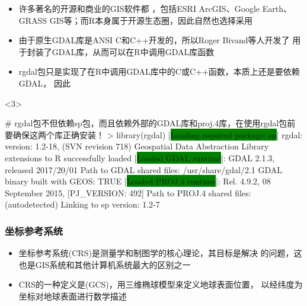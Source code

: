 \begin{frame}[t,fragile]{\subsecname}{\subsubsecname}
\begin{itemize}
\item<1-> 许多著名的开源和商业的GIS软件都
，包括ESRI ArcGIS、Google Earth、GRASS GIS等；而R本身属于开源生态圈，因此自然也选择采用
\item<2-> 由于原生GDAL库是ANSI C和C++开发的，所以Roger Bivand等人开发了
用于封装了GDAL库，从而可以在R中调用GDAL库函数
\item<3-> rgdal包只是实现了在R中调用GDAL库中的C或C++函数，本质上还是要依赖GDAL，
因此
\end{itemize}

\begin{onlyenv}<3>
\begin{rcode}
# rgdal包不但依赖sp包，而且依赖外部的GDAL库和proj.4库，在使用rgdal包前要确保这两个库正确安装！
> library(rgdal)
|\colorbox{green}{Loading required package: sp}|
rgdal: version: 1.2-18, (SVN revision 718)
 Geospatial Data Abstraction Library extensions to R successfully loaded
 |\colorbox{green}{Loaded GDAL runtime}|: GDAL 2.1.3, released 2017/20/01
 Path to GDAL shared files: /usr/share/gdal/2.1
 GDAL binary built with GEOS: TRUE 
 |\colorbox{green}{Loaded PROJ.4 runtime}|: Rel. 4.9.2, 08 September 2015, [PJ_VERSION: 492]
 Path to PROJ.4 shared files: (autodetected)
 Linking to sp version: 1.2-7 
\end{rcode}
\end{onlyenv}
\end{frame}


\subsubsection{坐标参考系统}

\begin{frame}[t]{\subsecname}{\subsubsecname}
\begin{itemize}
\item<1->坐标参考系统(CRS)是测量学和制图学的核心理论，其目标是解决
的问题，这也是GIS系统和其他计算机系统最大的区别之一
\item<2-> CRS的一种定义是(GCS)，用三维椭球模型来定义地球表面位置，
以经纬度为坐标对地球表面进行数学描述
\end{itemize}

\begin{overlayarea}{\textwidth}{\textheight}
\end{overlayarea}
\end{frame}

